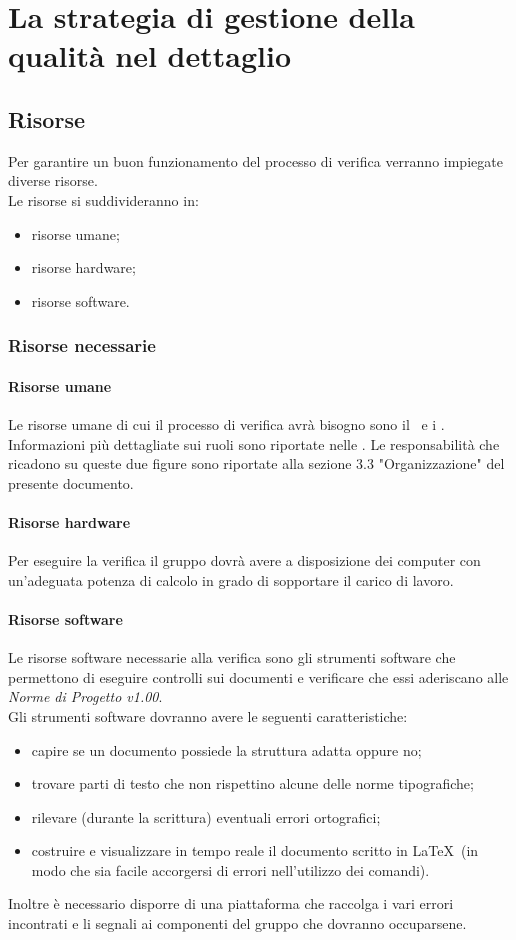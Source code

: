 \documentclass[../PianoDiQualifica.tex]{subfiles}
\begin{document}
\section{La strategia di gestione della qualità nel dettaglio}
		\subsection{Risorse}
		Per garantire un buon funzionamento del processo di verifica verranno impiegate diverse risorse.\\
		Le risorse si suddivideranno in:
		\begin{itemize}
			\item risorse umane;
			\item risorse hardware;
			\item risorse software.
		\end{itemize}
			\subsubsection{Risorse necessarie}
				\paragraph{Risorse umane}
				Le risorse umane di cui il processo di verifica avrà bisogno sono il \responsabilediprogetto\ e i \verificatori.
				Informazioni più dettagliate sui ruoli sono riportate nelle \normediprogettov. Le responsabilità che ricadono su queste due figure sono riportate alla sezione 3.3 "Organizzazione" del presente documento.
				\paragraph{Risorse hardware}
				Per eseguire la verifica il gruppo dovrà avere a disposizione dei computer con un'adeguata potenza di calcolo in grado di sopportare il carico di lavoro.		    
				\paragraph{Risorse software}
			    Le risorse software necessarie alla verifica sono gli strumenti software che permettono di eseguire controlli sui documenti e verificare che essi aderiscano alle \textit{Norme di Progetto v1.00}.\\
			    Gli strumenti software dovranno avere le seguenti caratteristiche:
			    \begin{itemize}
			    \item capire se un documento possiede la struttura adatta oppure no;
			    \item trovare parti di testo che non rispettino alcune delle norme tipografiche;
			    \item rilevare (durante la scrittura) eventuali errori ortografici;
			    \item costruire e visualizzare in tempo reale il documento scritto in \LaTeX\ (in modo che sia facile accorgersi di errori nell'utilizzo dei comandi).
			    \end{itemize}
			    Inoltre è necessario disporre di una piattaforma che raccolga i vari errori incontrati e li segnali ai componenti del gruppo che dovranno occuparsene. 
\end{document}
